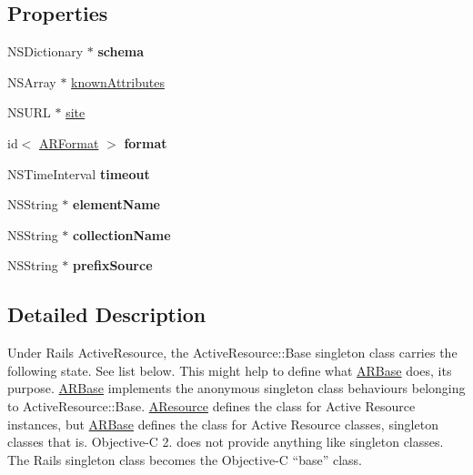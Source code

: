\subsection*{\-Properties}
\begin{DoxyCompactItemize}
\item 
\hypertarget{interface_a_r_base_a90a5f2ff51f15ba2bc36fc6758e7174c}{
\-N\-S\-Dictionary $\ast$ {\bfseries schema}}
\label{interface_a_r_base_a90a5f2ff51f15ba2bc36fc6758e7174c}

\item 
\-N\-S\-Array $\ast$ \hyperlink{interface_a_r_base_a56a8d73d2c0c3792d09a05b1f9588540}{known\-Attributes}
\item 
\-N\-S\-U\-R\-L $\ast$ \hyperlink{interface_a_r_base_a41acdb2fabc743190d933890aa6e0f33}{site}
\item 
\hypertarget{interface_a_r_base_a60e2982670a0a74d86826c2d4e7d011e}{
id$<$ \hyperlink{protocol_a_r_format-p}{\-A\-R\-Format} $>$ {\bfseries format}}
\label{interface_a_r_base_a60e2982670a0a74d86826c2d4e7d011e}

\item 
\hypertarget{interface_a_r_base_a8805a1ed23887536d301f4b7c60c2ee4}{
\-N\-S\-Time\-Interval {\bfseries timeout}}
\label{interface_a_r_base_a8805a1ed23887536d301f4b7c60c2ee4}

\item 
\hypertarget{interface_a_r_base_a7270c73ec630fa23e6c40127cad1d6b3}{
\-N\-S\-String $\ast$ {\bfseries element\-Name}}
\label{interface_a_r_base_a7270c73ec630fa23e6c40127cad1d6b3}

\item 
\hypertarget{interface_a_r_base_a6ff2e189e97fa9379fb6cee21d394d7a}{
\-N\-S\-String $\ast$ {\bfseries collection\-Name}}
\label{interface_a_r_base_a6ff2e189e97fa9379fb6cee21d394d7a}

\item 
\hypertarget{interface_a_r_base_a715c28f41031f99b4e763c52717f001c}{
\-N\-S\-String $\ast$ {\bfseries prefix\-Source}}
\label{interface_a_r_base_a715c28f41031f99b4e763c52717f001c}

\end{DoxyCompactItemize}


\subsection{\-Detailed \-Description}
\-Under \-Rails \-Active\-Resource, the \-Active\-Resource\-::\-Base singleton class carries the following state. \-See list below. \-This might help to define what \hyperlink{interface_a_r_base}{\-A\-R\-Base} does, its purpose. \hyperlink{interface_a_r_base}{\-A\-R\-Base} implements the anonymous singleton class behaviours belonging to \-Active\-Resource\-::\-Base. \hyperlink{interface_a_resource}{\-A\-Resource} defines the class for \-Active \-Resource instances, but \hyperlink{interface_a_r_base}{\-A\-R\-Base} defines the class for \-Active \-Resource classes, singleton classes that is. \-Objective-\/\-C 2. does not provide anything like singleton classes. \-The \-Rails singleton class becomes the \-Objective-\/\-C “base” class.

